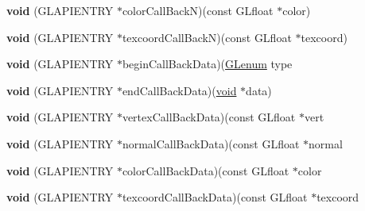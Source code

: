 \begin{DoxyCompactItemize}
\item 
\mbox{\label{class_open_g_l_curve_evaluator_a35e32c28ceb770b94aa4ad224784375f}} 
{\bfseries void} (G\+L\+A\+P\+I\+E\+N\+T\+RY $\ast$color\+Call\+BackN)(const G\+Lfloat $\ast$color)
\item 
\mbox{\label{class_open_g_l_curve_evaluator_a04655062e2d0129704e9e73bc35bc671}} 
{\bfseries void} (G\+L\+A\+P\+I\+E\+N\+T\+RY $\ast$texcoord\+Call\+BackN)(const G\+Lfloat $\ast$texcoord)
\item 
\mbox{\label{class_open_g_l_curve_evaluator_a7727bdaf3ba75bb71a4933f33eba21f6}} 
{\bfseries void} (G\+L\+A\+P\+I\+E\+N\+T\+RY $\ast$begin\+Call\+Back\+Data)(\hyperlink{interfacevoid}{G\+Lenum} type
\item 
\mbox{\label{class_open_g_l_curve_evaluator_a2c3e8d349cf3254b5d683eb5e084d237}} 
{\bfseries void} (G\+L\+A\+P\+I\+E\+N\+T\+RY $\ast$end\+Call\+Back\+Data)(\hyperlink{interfacevoid}{void} $\ast$data)
\item 
\mbox{\label{class_open_g_l_curve_evaluator_adc563d4adfb5cb321af056a89087d95b}} 
{\bfseries void} (G\+L\+A\+P\+I\+E\+N\+T\+RY $\ast$vertex\+Call\+Back\+Data)(const G\+Lfloat $\ast$vert
\item 
\mbox{\label{class_open_g_l_curve_evaluator_ad15e92d4b423135c963aae4943710a5d}} 
{\bfseries void} (G\+L\+A\+P\+I\+E\+N\+T\+RY $\ast$normal\+Call\+Back\+Data)(const G\+Lfloat $\ast$normal
\item 
\mbox{\label{class_open_g_l_curve_evaluator_aa11f1094cf8c298be4f411d9a07742ee}} 
{\bfseries void} (G\+L\+A\+P\+I\+E\+N\+T\+RY $\ast$color\+Call\+Back\+Data)(const G\+Lfloat $\ast$color
\item 
\mbox{\label{class_open_g_l_curve_evaluator_a05ab8b805a05a72ea1f1bc175e1eaf06}} 
{\bfseries void} (G\+L\+A\+P\+I\+E\+N\+T\+RY $\ast$texcoord\+Call\+Back\+Data)(const G\+Lfloat $\ast$texcoord
\item 
\mbox{\label{class_open_g_l_curve_evaluator_a7ade56f0d4f2eea9a3cd66e5345b3ad3}} 

\end{DoxyCompactItemize}
